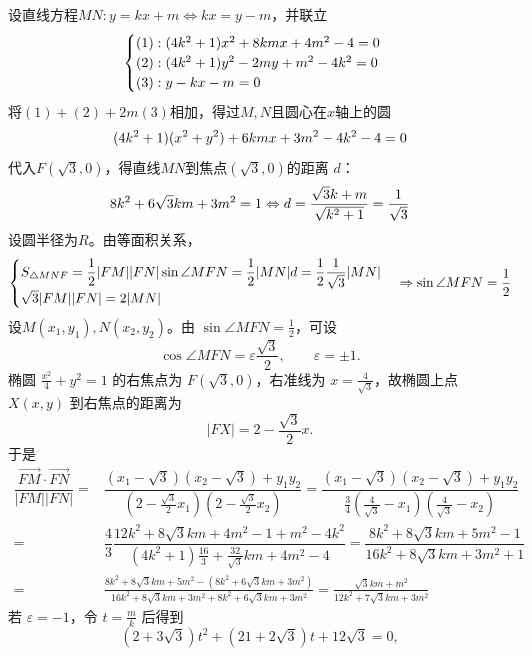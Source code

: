 \begin{solution}
    设直线方程$MN:y=kx+m\Leftrightarrow kx=y-m$，并联立
    \vspace{-5pt}
    \[\begin{cases}(1):(4k^2+1)x^2+8kmx+4m^2-4=0\\(2):(4k^2+1)y^2-2my+m^2-4k^2=0\\(3):y-kx-m=0\end{cases}\vspace{-5pt}\]
    将$(1)+(2)+2m(3)$相加，得过$M,N$且圆心在$x$轴上的圆\vspace{-5pt}
    \[(4k^2+1)(x^2+y^2)+6kmx+3m^2-4k^2-4=0\vspace{-5pt}\]
    代入$F(\sqrt3,0)$，得直线$MN$到焦点$(\sqrt3,0)$的距离 $d$：\vspace{-5pt}
    \[8k^2+6\sqrt{3}km+3m^2=1\Leftrightarrow d=\dfrac{\sqrt{3}k+m}{\sqrt{k^2+1}}=\dfrac{1}{\sqrt3}\vspace{-5pt}\]
    设圆半径为$R$。由等面积关系，
    \vspace{-5pt}\[\begin{cases}S_{\triangle{MNF}}=\dfrac12|FM||FN|\sin\angle{MFN}=\dfrac12|MN|d=\dfrac{1}{2}\dfrac{1}{\sqrt3}|MN|\\\sqrt{3}|FM||FN|=2|MN|\end{cases}\Rightarrow \sin\angle{MFN}=\dfrac12\vspace{-5pt}\]
    设$M(x_1,y_1),N(x_2,y_2)$。由 $\sin\angle MFN=\frac12$，可设
    \[
    \cos\angle MFN=\varepsilon\frac{\sqrt3}{2},\qquad \varepsilon=\pm1.
    \]
    椭圆 $\frac{x^2}{4}+y^2=1$ 的右焦点为 $F(\sqrt3,0)$，右准线为 $x=\frac4{\sqrt3}$，故椭圆上点 $X(x,y)$ 到右焦点的距离为
    \[
    |FX|=2-\frac{\sqrt3}{2}x.
    \]
    于是
    \begin{align*}
        \dfrac{\overrightarrow{FM}\cdot\overrightarrow{FN}}{|FM||FN|}
        =&\dfrac{(x_1-\sqrt3)(x_2-\sqrt3)+y_1y_2}{(2-\frac{\sqrt3}{2}x_1)(2-\frac{\sqrt3}{2}x_2)}=\dfrac{(x_1-\sqrt3)(x_2-\sqrt3)+y_1y_2}{\frac34(\frac{4}{\sqrt3}-x_1)(\frac{4}{\sqrt3}-x_2)}\\
        =&\dfrac{4}{3}\dfrac{12k^2+8\sqrt{3}km+4m^2-1+m^2-4k^2}{(4k^2+1)\frac{16}{3}+\frac{32}{\sqrt3}km+4m^2-4}=\dfrac{8k^2+8\sqrt{3}km+5m^2-1}{16k^2+8\sqrt{3}km+3m^2+1}\\
        =&\frac{8k^2+8\sqrt{3}km+5m^2-(8k^2+6\sqrt{3}km+3m^2)}{16k^2+8\sqrt{3}km+3m^2+8k^2+6\sqrt{3}km+3m^2}=\frac{\sqrt3km+m^2}{12k^2+7\sqrt3km+3m^2}
    \end{align*}
    若 $\varepsilon=-1$，令 $t=\frac{m}{k}$ 后得到
    \[
    (2+3\sqrt3)t^2+(21+2\sqrt3)t+12\sqrt3=0,
\]
\end{solution}
